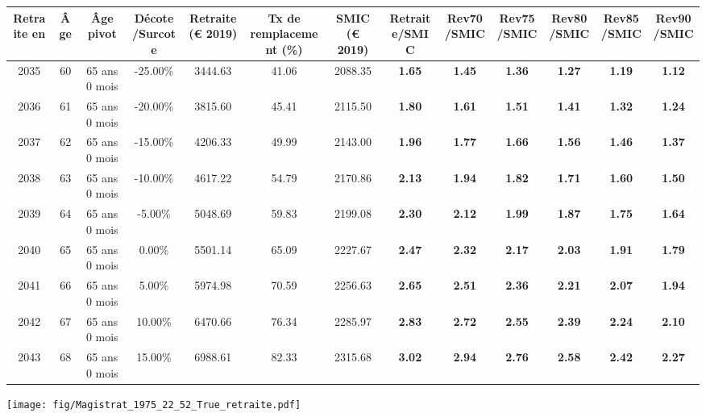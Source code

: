 { \scriptsize \begin{center} 
\begin{tabular}[htb]{|c|c||c|c||c|c||c||c|c|c|c|c|c|} 
\hline 
 Retraite en &  Âge &  Âge pivot &  Décote/Surcote &  Retraite (\euro{} 2019) &  Tx de remplacement (\%) &  SMIC (\euro{} 2019) &  Retraite/SMIC &  Rev70/SMIC &  Rev75/SMIC &  Rev80/SMIC &  Rev85/SMIC &  Rev90/SMIC \\ 
\hline \hline 
 2035 &  60 &  65 ans 0 mois &  -25.00\% &  3444.63 &  41.06 &  2088.35 &  {\bf 1.65} &  {\bf 1.45} &  {\bf 1.36} &  {\bf 1.27} &  {\bf 1.19} &  {\bf 1.12} \\ 
\hline 
 2036 &  61 &  65 ans 0 mois &  -20.00\% &  3815.60 &  45.41 &  2115.50 &  {\bf 1.80} &  {\bf 1.61} &  {\bf 1.51} &  {\bf 1.41} &  {\bf 1.32} &  {\bf 1.24} \\ 
\hline 
 2037 &  62 &  65 ans 0 mois &  -15.00\% &  4206.33 &  49.99 &  2143.00 &  {\bf 1.96} &  {\bf 1.77} &  {\bf 1.66} &  {\bf 1.56} &  {\bf 1.46} &  {\bf 1.37} \\ 
\hline 
 2038 &  63 &  65 ans 0 mois &  -10.00\% &  4617.22 &  54.79 &  2170.86 &  {\bf 2.13} &  {\bf 1.94} &  {\bf 1.82} &  {\bf 1.71} &  {\bf 1.60} &  {\bf 1.50} \\ 
\hline 
 2039 &  64 &  65 ans 0 mois &  -5.00\% &  5048.69 &  59.83 &  2199.08 &  {\bf 2.30} &  {\bf 2.12} &  {\bf 1.99} &  {\bf 1.87} &  {\bf 1.75} &  {\bf 1.64} \\ 
\hline 
 2040 &  65 &  65 ans 0 mois &  0.00\% &  5501.14 &  65.09 &  2227.67 &  {\bf 2.47} &  {\bf 2.32} &  {\bf 2.17} &  {\bf 2.03} &  {\bf 1.91} &  {\bf 1.79} \\ 
\hline 
 2041 &  66 &  65 ans 0 mois &  5.00\% &  5974.98 &  70.59 &  2256.63 &  {\bf 2.65} &  {\bf 2.51} &  {\bf 2.36} &  {\bf 2.21} &  {\bf 2.07} &  {\bf 1.94} \\ 
\hline 
 2042 &  67 &  65 ans 0 mois &  10.00\% &  6470.66 &  76.34 &  2285.97 &  {\bf 2.83} &  {\bf 2.72} &  {\bf 2.55} &  {\bf 2.39} &  {\bf 2.24} &  {\bf 2.10} \\ 
\hline 
 2043 &  68 &  65 ans 0 mois &  15.00\% &  6988.61 &  82.33 &  2315.68 &  {\bf 3.02} &  {\bf 2.94} &  {\bf 2.76} &  {\bf 2.58} &  {\bf 2.42} &  {\bf 2.27} \\ 
\hline 
\hline 
\end{tabular} 
\end{center} } 

 \begin{center}\texttt{[image: fig/Magistrat\_1975\_22\_52\_True\_retraite.pdf]}\end{center} 

